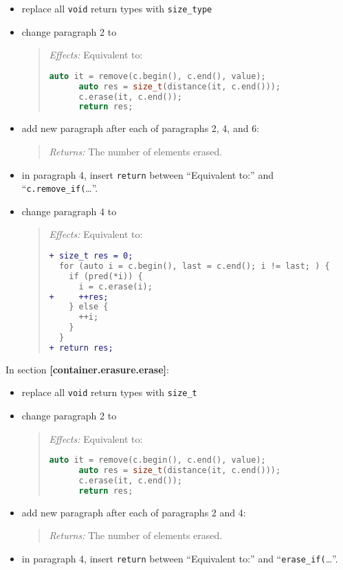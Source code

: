 \documentclass[11pt]{article}
\begin{document}
\begin{itemize}
\item replace all \texttt{void} return types with \texttt{size\_type}
\item change paragraph 2 to
  \begin{quotation}
    \textit{Effects:} Equivalent to:
    \begin{lstlisting}[language=C++]
      auto it = remove(c.begin(), c.end(), value);
      auto res = size_t(distance(it, c.end()));
      c.erase(it, c.end());
      return res;
    \end{lstlisting}
  \end{quotation}
\item add new paragraph after each of paragraphs 2, 4, and 6:
  \begin{quotation}
    \textit{Returns:} The number of elements erased.
  \end{quotation}
\item in paragraph 4, insert \texttt{return} between ``Equivalent
  to:'' and ``\texttt{c.remove\_if(}\ldots''.
\item change paragraph 4 to
  \begin{quotation}
    \textit{Effects:} Equivalent to:
    \begin{lstlisting}[language=diff]
+ size_t res = 0;
  for (auto i = c.begin(), last = c.end(); i != last; ) {
    if (pred(*i)) {
      i = c.erase(i);
+     ++res;
    } else {
      ++i;
    }
  }
+ return res;
    \end{lstlisting}
  \end{quotation}
\end{itemize}

In section \textbf{[container.erasure.erase]}:

\begin{itemize}
\item replace all \texttt{void} return types with \texttt{size\_t}
\item change paragraph 2 to
  \begin{quotation}
    \textit{Effects:} Equivalent to:
    \begin{lstlisting}[language=C++]
      auto it = remove(c.begin(), c.end(), value);
      auto res = size_t(distance(it, c.end()));
      c.erase(it, c.end());
      return res;
    \end{lstlisting}
  \end{quotation}
\item add new paragraph after each of paragraphs 2 and 4:
  \begin{quotation}
    \textit{Returns:} The number of elements erased.
  \end{quotation}
\item in paragraph 4, insert \texttt{return} between ``Equivalent to:'' and ``\texttt{erase\_if(}\ldots''.
\end{itemize}
\end{document}
